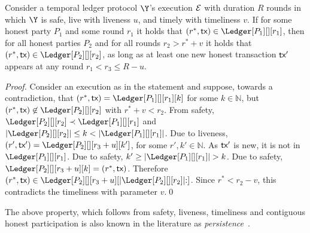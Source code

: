 \begin{lemma}\label{lem:past-perfect}
  Consider a temporal ledger protocol $\Y$'s
  execution $\mathcal{E}$ with duration $R$ rounds in which $\Y$ is
  safe, live with liveness $u$, and timely with timeliness $v$.
  If for some honest party $P_1$ and some round $r_1$ it holds that
  $(r^*, \tx) \in \Ledger[P_1][][r_1]$, then
  for all honest parties $P_2$ and for all rounds $r_2 > r^* + v$
  it holds that
  $(r^*, \tx) \in \Ledger[P_2][][r_2]$,
  as long as at least one new honest transaction $\textsf{tx}'$ appears at
  any round $r_1 < r_3 \leq R - u$.
\end{lemma}
\begin{proof}
  Consider an execution as in the statement and suppose, towards a contradiction,
  that $(r^*, \tx) = \Ledger[P_1][][r_1][k]$ for some $k \in \mathbb{N}$,
  but $(r^*, \tx) \not\in \Ledger[P_2][][r_2]$
  with $r^* + v < r_2$.
  From safety,
  $\Ledger[P_2][][r_2] \prec \Ledger[P_1][][r_1]$ and
  $|\Ledger[P_2][][r_2]| \leq k < |\Ledger[P_1][][r_1]|$.
  Due to liveness, $(r', \tx') = \Ledger[P_2][][r_3 + u][k']$,
  for some $r', k' \in \mathbb{N}$.
  As $\textsf{tx}'$ is new, it is not in $\Ledger[P_1][][r_1]$.
  Due to safety, $k' \geq |\Ledger[P_1][][r_1]| > k$.
  Due to safety, $\Ledger[P_2][][r_3 + u][k] = (r^*, \tx)$.
  Therefore
  $(r^*, \tx) \in \Ledger[P_2][][r_3 + u][|\Ledger[P_2][][r_2]|{:}]$.
  Since $r^* < r_2 - v$, this contradicts the timeliness with parameter $v$.\qed
\end{proof}

The above property, which follows from safety, liveness, timeliness and
contiguous honest participation is also known in the literature as
\emph{persistence}~\cite{backbone}.

